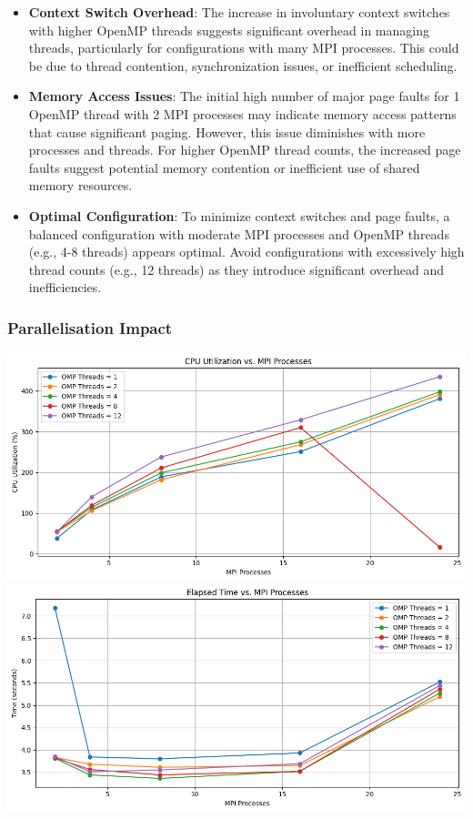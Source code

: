 \documentclass[
]{article}
\begin{document}
\begin{itemize}
\item
  \textbf{Context Switch Overhead}: The increase in involuntary context
  switches with higher OpenMP threads suggests significant overhead in
  managing threads, particularly for configurations with many MPI
  processes. This could be due to thread contention, synchronization
  issues, or inefficient scheduling.
\item
  \textbf{Memory Access Issues}: The initial high number of major page
  faults for 1 OpenMP thread with 2 MPI processes may indicate memory
  access patterns that cause significant paging. However, this issue
  diminishes with more processes and threads. For higher OpenMP thread
  counts, the increased page faults suggest potential memory contention
  or inefficient use of shared memory resources.
\item
  \textbf{Optimal Configuration}: To minimize context switches and page
  faults, a balanced configuration with moderate MPI processes and
  OpenMP threads (e.g., 4-8 threads) appears optimal. Avoid
  configurations with excessively high thread counts (e.g., 12 threads)
  as they introduce significant overhead and inefficiencies.
\end{itemize}

\subsubsection{Parallelisation Impact}\label{parallelisation-impact-2}

\includegraphics{figures/cpu.png} \includegraphics{figures/elapsed.png}
\end{document}
